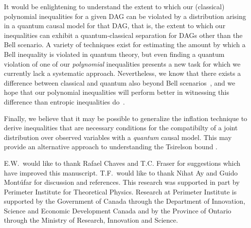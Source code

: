 It would be enlightening to understand the extent to which our (classical) polynomial inequalities for a given DAG can be violated by a distribution arising in a quantum causal model for that DAG, that is, the extent to which our inequalities can exhibit  a quantum-classical separation for DAGs other than the Bell scenario.  A variety of techniques exist for estimating the amount by which a Bell inequality \cite{NPA2008Long,I3322NPA1} is violated in quantum theory, but even finding a quantum violation of one of our \emph{polynomial} inequalities presents a new task for which we currently lack a systematic approach. Nevertheless, we know that there exists a difference between classical and quantum also beyond Bell scenarios~\cite[Theorem~2.16]{fritz2012bell}, and we hope that our polynomial inequalities will perform better in witnessing this difference than entropic inequalities do~\cite{pusey2014gdag,Chaves2015infoquantum}.

Finally, we believe that it may be possible to generalize the inflation technique to derive inequalities that are necessary conditions for the compatibilty of a joint distribution over observed variables with a {\em quantum} causal model.  This may provide an alternative approach to understanding the Tsirelson bound \cite{Brunner2013Bell}.







\begin{acknowledgments}
E.W.~would like to thank Rafael Chaves and T.C. Fraser for suggestions which have improved this manuscript. T.F.~would like to thank Nihat Ay and Guido Mont\'ufar for discussion and references. This research was supported in part by Perimeter Institute for Theoretical Physics. Research at Perimeter Institute is supported by the Government of Canada through the Department of Innovation, Science and Economic Development Canada and by the Province of Ontario through the Ministry of Research, Innovation and Science.
\end{acknowledgments}


